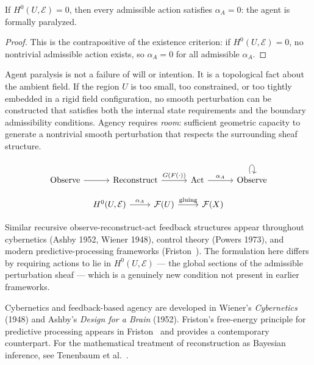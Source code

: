 \begin{theorem}
  \label{thm:paralyzed-agent}
  \statusproven{}
  If $H^0(U,\mathcal{E}) = 0$, then every admissible action
  satisfies $\alpha_A = 0$: the agent is formally paralyzed.
\end{theorem}

\begin{proof}
  This is the contrapositive of the existence criterion:
  if $H^0(U,\mathcal{E}) = 0$, no nontrivial admissible action
  exists, so $\alpha_A = 0$ for all admissible $\alpha_A$.
\end{proof}

\begin{InterpBox}
  Agent paralysis is not a failure of will or intention.
  It is a topological fact about the ambient field.
  If the region $U$ is too small, too constrained, or too
  tightly embedded in a rigid field configuration, no smooth
  perturbation can be constructed that satisfies both the
  internal state requirements and the boundary admissibility
  conditions.
  Agency requires \emph{room}: sufficient geometric capacity
  to generate a nontrivial smooth perturbation that respects
  the surrounding sheaf structure.
\end{InterpBox}


\[
\begin{tikzcd}[column sep=3em]
  \text{Observe}
  \arrow[r]
  &
  \text{Reconstruct}
  \arrow[r,"G(F(\cdot))"]
  &
  \text{Act}
  \arrow[r,"\alpha_A"]
  &
  \text{Observe}
  \arrow[loop above]{}{}
\end{tikzcd}
\]

\[
\begin{tikzcd}
  H^0(U,\mathcal{E})
  \arrow[r,"\alpha_A"]
  &
  \mathcal{F}(U)
  \arrow[r,"\text{gluing}"]
  &
  \mathcal{F}(X)
\end{tikzcd}
\]

\begin{CitationAnchor}
  Similar recursive observe-reconstruct-act feedback structures
  appear throughout cybernetics (Ashby 1952, Wiener 1948),
  control theory (Powers 1973), and modern predictive-processing
  frameworks (Friston~\cite{friston2010}).
  The formulation here differs by requiring actions to lie in
  $H^0(U,\mathcal{E})$ --- the global sections of the admissible
  perturbation sheaf --- which is a genuinely new condition
  not present in earlier frameworks.
\end{CitationAnchor}

\begin{FurtherReading}
  Cybernetics and feedback-based agency are developed in
  Wiener's \textit{Cybernetics} (1948) and Ashby's
  \textit{Design for a Brain} (1952).
  Friston's free-energy principle for predictive processing
  appears in Friston~\cite{friston2010} and provides a
  contemporary counterpart.
  For the mathematical treatment of reconstruction as Bayesian
  inference, see Tenenbaum et al.~\cite{tenenbaum2011}.
\end{FurtherReading}
